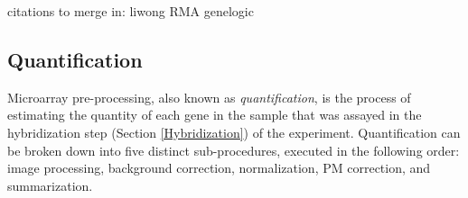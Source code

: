 
%
%

citations to merge in:
liwong                  \cite{mbei,dchip}
RMA                     \cite{rma}
genelogic               \cite{genelogic}


\subsection{Quantification}
\label{Quantification}

Microarray pre-processing, also known as \emph{quantification}, is the
process of estimating the quantity of each gene in the sample that was assayed
in the hybridization step (Section \ref{Hybridization}) of the experiment.
Quantification can be broken down into five distinct sub-procedures, executed
in the following order: image processing, background correction, normalization,
PM correction, and summarization.

